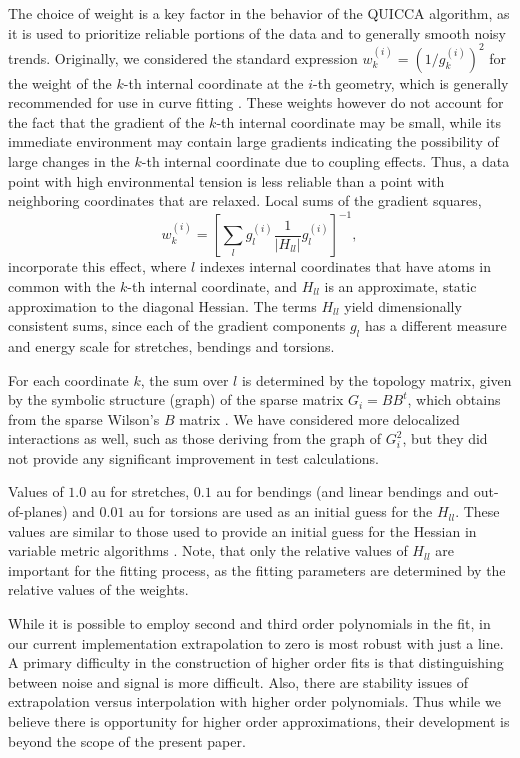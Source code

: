 \documentclass[prl,aps,preprint,showpacs,superbib]{revtex4}
\begin{document}
The choice of weight is a key factor in the behavior of the QUICCA algorithm, as it is used to prioritize 
reliable portions of the data and to generally smooth noisy trends.  
Originally, we considered the standard expression $w_{k}^{(i)}=\left(1/{g_{k}^{(i)}}\right)^2$ for the weight 
of the $k$-th internal coordinate at the $i$-th geometry, which is generally recommended for use in curve 
fitting \cite{numerical_recipies}.  These weights however do not 
account for the fact that the gradient of the $k$-th internal coordinate may be small, while 
its immediate  environment may contain large gradients indicating the possibility of large changes in the $k$-th 
internal coordinate due to coupling effects.  Thus, a data point with high environmental tension 
is less reliable than a point with neighboring coordinates that are relaxed.   
Local sums of the gradient squares,
\begin{equation}
\label{weights}
w_{k}^{(i)} = \left[ \sum_{l} g_{l}^{(i)} \frac{1}{|H_{ll}^{}|} g_{l}^{(i)} \right]^{-1} ,
\end{equation}
incorporate this effect, where  $l$ indexes internal coordinates that have atoms in common with 
the $k$-th internal coordinate, and $H_{ll}^{}$ is an approximate, static approximation to the 
diagonal Hessian.  The terms $H_{ll}$ yield dimensionally consistent sums, since each of the gradient 
components  $g_{l}$ has a different measure and energy scale for stretches, bendings and torsions.  

For each coordinate $k$, the sum over $l$ is determined by the topology matrix, given by the symbolic 
structure (graph) of the sparse matrix $G_{i}=BB^{t}$, which obtains from the sparse Wilson's $B$ 
matrix \cite{wilson}.  We have considered more delocalized interactions as well, such as those deriving 
from the graph of $G_i^2$, but they did not provide any significant improvement in test calculations.

Values of $1.0$ au for stretches, $0.1$ au for bendings (and linear bendings and out-of-planes) and $0.01$ au
for torsions are used as an initial guess for the $H_{ll}$.  These values are similar to those used to provide 
an initial guess for the Hessian in variable metric algorithms \cite{bakken}.  Note, that only the relative 
values of $H_{ll}$ are important for the fitting process, as the fitting parameters are determined by the 
relative values of the weights.  

While it is possible to employ second and third order polynomials in the fit, in our 
current implementation extrapolation to zero is most robust with just a line.  
A primary difficulty in the construction of higher order fits is that distinguishing 
between noise and signal is more difficult.  Also, there are stability 
issues of extrapolation versus interpolation with higher order polynomials.
Thus while we believe there is opportunity for higher order approximations,  
their development is beyond the scope of the present paper.  
\end{document}
